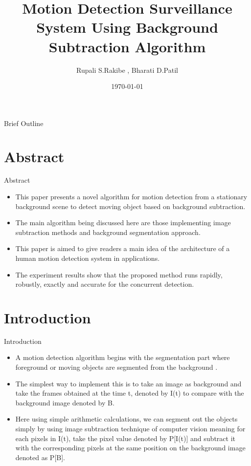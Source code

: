 \documentclass{beamer}
\title[Your Short Title]{Motion Detection Surveillance System Using Background Subtraction Algorithm}
\author{Rupali S.Rakibe , Bharati D.Patil}
\date{\today}
\begin{document}
\begin{frame}
  \titlepage
\end{frame}
\begin{frame}{Brief Outline}
 \tableofcontents
\end{frame}
\section{Abstract}
\begin{frame}{Abstract}
\begin{itemize}
\item 
This paper presents a novel algorithm for motion detection from a stationary background scene to detect moving object based on background subtraction. \\
\item 
The main algorithm being discussed here are those implementing image subtraction methods and background segmentation approach.\\
\item 
This paper is aimed to give readers a main idea of the architecture of a human motion detection system in applications.\\
\item 
The experiment results show that the proposed method runs rapidly, robustly, exactly and accurate for the concurrent detection.\\
\end{itemize}
\end{frame}
\section{Introduction}
\begin{frame}{Introduction}
\begin{itemize}
\item
A motion detection algorithm begins with the segmentation part where foreground or moving objects are segmented from the background .\\
\item
The simplest way to implement this is to take an image as background and take the frames obtained at the time t, denoted by I(t) to compare with the background image denoted by B.\\
\item
Here using simple arithmetic calculations, we can segment out the objects simply by using image subtraction technique of computer vision meaning for each pixels in I(t), take the pixel value denoted by P[I(t)] and subtract it with the corresponding pixels at the same position on the background image denoted as P[B]. \\
\end{itemize}
\end{frame}
\end{document}
